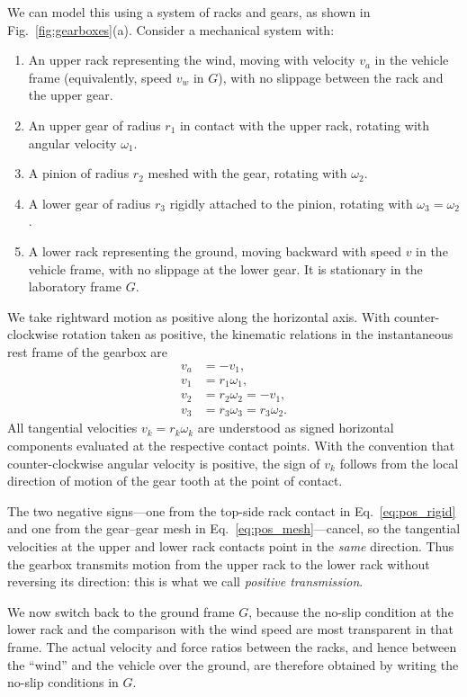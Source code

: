 \documentclass[a4paper]{article}
\begin{document}
We can model this using a system of racks and gears, as shown in Fig.~\ref{fig:gearboxes}(a). Consider a mechanical system with:
\begin{enumerate}
\item An upper rack representing the wind, moving with velocity $v_a$ in the vehicle frame (equivalently, speed $v_w$ in $G$), with no slippage between the rack and the upper gear.
\item An upper gear of radius $r_1$ in contact with the upper rack, rotating with angular velocity $\omega_1$.
\item A pinion of radius $r_2$ meshed with the gear, rotating with $\omega_2$.
\item A lower gear of radius $r_3$ rigidly attached to the pinion, rotating with $\omega_3 = \omega_2$.
\item A lower rack representing the ground, moving backward with speed $v$ in the vehicle frame, with no slippage at the lower gear. It is stationary in the laboratory frame $G$.
\end{enumerate}

We take rightward motion as positive along the horizontal axis.
With counter-clockwise rotation taken as positive, the kinematic relations in
the instantaneous rest frame of the gearbox are
\begin{align}
v_a &= -v_1,  \label{eq:pos_rigid}\\
v_1 &= r_1 \omega_1,\\
v_2 &= r_2 \omega_2 = -v_1, \label{eq:pos_mesh}\\
v_3 &= r_3 \omega_3 = r_3 \omega_2.
\end{align}
All tangential velocities \(v_k = r_k \omega_k\) are understood as signed horizontal
components evaluated at the respective contact points. With the convention that
counter-clockwise angular velocity is positive, the sign of \(v_k\) follows from the
local direction of motion of the gear tooth at the point of contact.

The two negative signs---one from the top-side rack contact in
Eq.~\eqref{eq:pos_rigid} and one from the gear--gear mesh in
Eq.~\eqref{eq:pos_mesh}---cancel, so the tangential velocities at the upper and
lower rack contacts point in the \emph{same} direction. Thus the gearbox
transmits motion from the upper rack to the lower rack without reversing its
direction: this is what we call \emph{positive transmission}.

We now switch back to the ground frame \(G\), because the no-slip condition at
the lower rack and the comparison with the wind speed are most transparent in
that frame. The actual velocity and force ratios between the racks, and hence
between the ``wind'' and the vehicle over the ground, are therefore obtained by
writing the no-slip conditions in \(G\).
\end{document}
